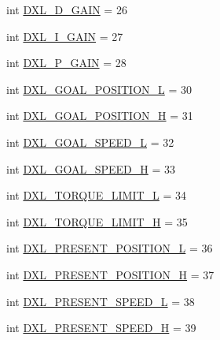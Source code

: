 \begin{DoxyCompactItemize}
\item 
int \hyperlink{namespacedynamixel__driver_1_1dynamixel__const_a9d000fc63d345b2537571e3f901e96cd}{D\+X\+L\+\_\+\+D\+\_\+\+G\+A\+IN} = 26
\item 
int \hyperlink{namespacedynamixel__driver_1_1dynamixel__const_a375905e641cfc9561927f3a8906a8d4c}{D\+X\+L\+\_\+\+I\+\_\+\+G\+A\+IN} = 27
\item 
int \hyperlink{namespacedynamixel__driver_1_1dynamixel__const_a32dcad49bcd8be7bb52b151a2082ac20}{D\+X\+L\+\_\+\+P\+\_\+\+G\+A\+IN} = 28
\item 
int \hyperlink{namespacedynamixel__driver_1_1dynamixel__const_a23e639147ad5f19ca7a915cc39b1c809}{D\+X\+L\+\_\+\+G\+O\+A\+L\+\_\+\+P\+O\+S\+I\+T\+I\+O\+N\+\_\+L} = 30
\item 
int \hyperlink{namespacedynamixel__driver_1_1dynamixel__const_ad55ea58c11e4c24019c6bebb9ba1902f}{D\+X\+L\+\_\+\+G\+O\+A\+L\+\_\+\+P\+O\+S\+I\+T\+I\+O\+N\+\_\+H} = 31
\item 
int \hyperlink{namespacedynamixel__driver_1_1dynamixel__const_a920f21aeb76e09350d05fac5a8a72cbd}{D\+X\+L\+\_\+\+G\+O\+A\+L\+\_\+\+S\+P\+E\+E\+D\+\_\+L} = 32
\item 
int \hyperlink{namespacedynamixel__driver_1_1dynamixel__const_a637865036456b8d5daf8b5a07495efc9}{D\+X\+L\+\_\+\+G\+O\+A\+L\+\_\+\+S\+P\+E\+E\+D\+\_\+H} = 33
\item 
int \hyperlink{namespacedynamixel__driver_1_1dynamixel__const_adb91b871265ede875f008de7a1a2e1ee}{D\+X\+L\+\_\+\+T\+O\+R\+Q\+U\+E\+\_\+\+L\+I\+M\+I\+T\+\_\+L} = 34
\item 
int \hyperlink{namespacedynamixel__driver_1_1dynamixel__const_a9791abb88d69e41922f90ac0333b752f}{D\+X\+L\+\_\+\+T\+O\+R\+Q\+U\+E\+\_\+\+L\+I\+M\+I\+T\+\_\+H} = 35
\item 
int \hyperlink{namespacedynamixel__driver_1_1dynamixel__const_a0ce5231949e400b46dc8192ab2b20c66}{D\+X\+L\+\_\+\+P\+R\+E\+S\+E\+N\+T\+\_\+\+P\+O\+S\+I\+T\+I\+O\+N\+\_\+L} = 36
\item 
int \hyperlink{namespacedynamixel__driver_1_1dynamixel__const_ad7afbe397f85254977a87c59a4afbb25}{D\+X\+L\+\_\+\+P\+R\+E\+S\+E\+N\+T\+\_\+\+P\+O\+S\+I\+T\+I\+O\+N\+\_\+H} = 37
\item 
int \hyperlink{namespacedynamixel__driver_1_1dynamixel__const_a7a0eb96cda38d8bb61294a6477d71545}{D\+X\+L\+\_\+\+P\+R\+E\+S\+E\+N\+T\+\_\+\+S\+P\+E\+E\+D\+\_\+L} = 38
\item 
int \hyperlink{namespacedynamixel__driver_1_1dynamixel__const_a0d34335373ec65f0d84ab5322cdc76ee}{D\+X\+L\+\_\+\+P\+R\+E\+S\+E\+N\+T\+\_\+\+S\+P\+E\+E\+D\+\_\+H} = 39

\end{DoxyCompactItemize}
